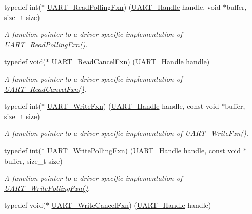\begin{DoxyCompactItemize}
typedef int($\ast$ \hyperlink{_u_a_r_t_8h_a6b57fb6a7c48272141a727c7de7290e4}{U\+A\+R\+T\+\_\+\+Read\+Polling\+Fxn}) (\hyperlink{_u_a_r_t_8h_a13cc669fae768d8212e6491ce71b28af}{U\+A\+R\+T\+\_\+\+Handle} handle, void $\ast$buffer, size\+\_\+t size)
\begin{DoxyCompactList}\small\item\em A function pointer to a driver specific implementation of \hyperlink{_u_a_r_t_8h_a6b57fb6a7c48272141a727c7de7290e4}{U\+A\+R\+T\+\_\+\+Read\+Polling\+Fxn()}. \end{DoxyCompactList}\item 
typedef void($\ast$ \hyperlink{_u_a_r_t_8h_aa46296acc2c197a775d44458e1eca197}{U\+A\+R\+T\+\_\+\+Read\+Cancel\+Fxn}) (\hyperlink{_u_a_r_t_8h_a13cc669fae768d8212e6491ce71b28af}{U\+A\+R\+T\+\_\+\+Handle} handle)
\begin{DoxyCompactList}\small\item\em A function pointer to a driver specific implementation of \hyperlink{_u_a_r_t_8h_aa46296acc2c197a775d44458e1eca197}{U\+A\+R\+T\+\_\+\+Read\+Cancel\+Fxn()}. \end{DoxyCompactList}\item 
typedef int($\ast$ \hyperlink{_u_a_r_t_8h_abe7ee32e202ad90d912b27693fe33672}{U\+A\+R\+T\+\_\+\+Write\+Fxn}) (\hyperlink{_u_a_r_t_8h_a13cc669fae768d8212e6491ce71b28af}{U\+A\+R\+T\+\_\+\+Handle} handle, const void $\ast$buffer, size\+\_\+t size)
\begin{DoxyCompactList}\small\item\em A function pointer to a driver specific implementation of \hyperlink{_u_a_r_t_8h_abe7ee32e202ad90d912b27693fe33672}{U\+A\+R\+T\+\_\+\+Write\+Fxn()}. \end{DoxyCompactList}\item 
typedef int($\ast$ \hyperlink{_u_a_r_t_8h_a68d0b77abdb9da6a868edc6529ae70ff}{U\+A\+R\+T\+\_\+\+Write\+Polling\+Fxn}) (\hyperlink{_u_a_r_t_8h_a13cc669fae768d8212e6491ce71b28af}{U\+A\+R\+T\+\_\+\+Handle} handle, const void $\ast$buffer, size\+\_\+t size)
\begin{DoxyCompactList}\small\item\em A function pointer to a driver specific implementation of \hyperlink{_u_a_r_t_8h_a68d0b77abdb9da6a868edc6529ae70ff}{U\+A\+R\+T\+\_\+\+Write\+Polling\+Fxn()}. \end{DoxyCompactList}\item 
typedef void($\ast$ \hyperlink{_u_a_r_t_8h_ac5a3d974279a2d161746dfbc8ca91774}{U\+A\+R\+T\+\_\+\+Write\+Cancel\+Fxn}) (\hyperlink{_u_a_r_t_8h_a13cc669fae768d8212e6491ce71b28af}{U\+A\+R\+T\+\_\+\+Handle} handle)

\end{DoxyCompactItemize}
